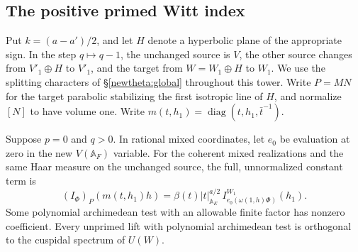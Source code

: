 \subsection{The positive primed Witt index}
\label{tpd:main}

Put \(k=(a-a')/2\), and let \(H\) denote a hyperbolic plane of the
appropriate sign. In the step \(q\mapsto q-1\), the unchanged source
is \(V\), the other source changes from \(V'_1\oplus H\) to \(V'_1\),
and the target from \(W=W_1\oplus H\) to \(W_1\). We use the
splitting characters of \S\ref{newtheta:global} throughout this tower.
Write \(P=MN\) for the target parabolic stabilizing the first
isotropic line of \(H\), and normalize \([N]\) to have volume one.
Write \(m(t,h_1)=\operatorname{diag}(t,h_1,\bar t^{-1})\).

\begin{proposition}[The unprimed coefficient when \(p=0\)]
\label{tpd:zero}
Suppose \(p=0\) and \(q>0\). In rational mixed coordinates, let
\(e_0\) be evaluation at zero in the new \(V(\mathbb A_F)\)
variable. For the coherent mixed realizations and the same Haar
measure on the unchanged source, the full, unnormalized constant term is
\[
 (I_\Phi)_P(m(t,h_1)h)=
 \beta(t)|t|_{\mathbb A_E}^{a/2}\,
 I^{W_1}_{e_0(\omega(1,h)\Phi)}(h_1).
\]
Some polynomial archimedean test with an allowable finite factor has
nonzero coefficient. Every unprimed lift with polynomial archimedean
test is orthogonal to the cuspidal spectrum of \(U(W)\).
\end{proposition}

